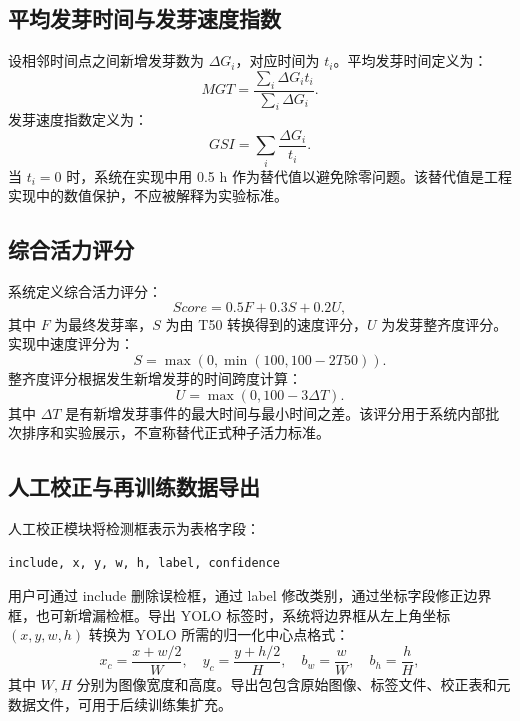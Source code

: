 \documentclass[UTF8,a4paper,zihao=-4]{ctexart}
\begin{document}
\subsection{平均发芽时间与发芽速度指数}

设相邻时间点之间新增发芽数为 $\Delta G_i$，对应时间为 $t_i$。平均发芽时间定义为：
\begin{equation}
MGT=\frac{\sum_i \Delta G_i t_i}{\sum_i \Delta G_i}.
\end{equation}
发芽速度指数定义为：
\begin{equation}
GSI=\sum_i \frac{\Delta G_i}{t_i}.
\end{equation}
当 $t_i=0$ 时，系统在实现中用 0.5 h 作为替代值以避免除零问题。该替代值是工程实现中的数值保护，不应被解释为实验标准。

\subsection{综合活力评分}

系统定义综合活力评分：
\begin{equation}
Score = 0.5F + 0.3S + 0.2U,
\end{equation}
其中 $F$ 为最终发芽率，$S$ 为由 T50 转换得到的速度评分，$U$ 为发芽整齐度评分。实现中速度评分为：
\begin{equation}
S = \max(0,\min(100,100-2T50)).
\end{equation}
整齐度评分根据发生新增发芽的时间跨度计算：
\begin{equation}
U=\max(0,100-3\Delta T).
\end{equation}
其中 $\Delta T$ 是有新增发芽事件的最大时间与最小时间之差。该评分用于系统内部批次排序和实验展示，不宣称替代正式种子活力标准。

\subsection{人工校正与再训练数据导出}

人工校正模块将检测框表示为表格字段：
\begin{lstlisting}
include, x, y, w, h, label, confidence
\end{lstlisting}
用户可通过 include 删除误检框，通过 label 修改类别，通过坐标字段修正边界框，也可新增漏检框。导出 YOLO 标签时，系统将边界框从左上角坐标 $(x,y,w,h)$ 转换为 YOLO 所需的归一化中心点格式：
\begin{equation}
x_c=\frac{x+w/2}{W},\quad y_c=\frac{y+h/2}{H},\quad b_w=\frac{w}{W},\quad b_h=\frac{h}{H},
\end{equation}
其中 $W,H$ 分别为图像宽度和高度。导出包包含原始图像、标签文件、校正表和元数据文件，可用于后续训练集扩充。
\end{document}
